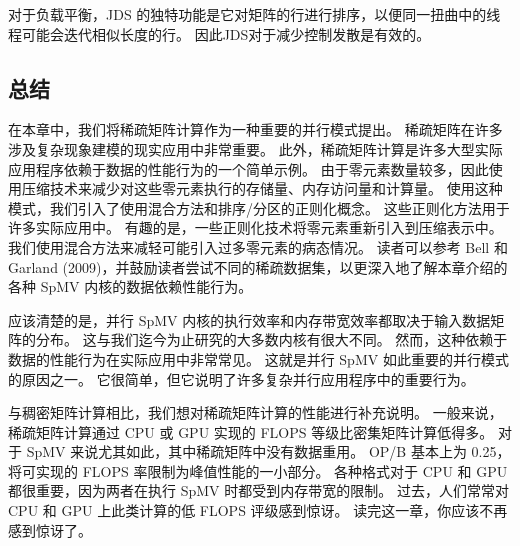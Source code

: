对于负载平衡，JDS 的独特功能是它对矩阵的行进行排序，以便同一扭曲中的线程可能会迭代相似长度的行。 因此JDS对于减少控制发散是有效的。

\subsection{总结}
在本章中，我们将稀疏矩阵计算作为一种重要的并行模式提出。 稀疏矩阵在许多涉及复杂现象建模的现实应用中非常重要。 此外，稀疏矩阵计算是许多大型实际应用程序依赖于数据的性能行为的一个简单示例。 由于零元素数量较多，因此使用压缩技术来减少对这些零元素执行的存储量、内存访问量和计算量。 使用这种模式，我们引入了使用混合方法和排序/分区的正则化概念。 这些正则化方法用于许多实际应用中。 有趣的是，一些正则化技术将零元素重新引入到压缩表示中。 我们使用混合方法来减轻可能引入过多零元素的病态情况。 读者可以参考 Bell 和 Garland (2009)，并鼓励读者尝试不同的稀疏数据集，以更深入地了解本章介绍的各种 SpMV 内核的数据依赖性能行为。

应该清楚的是，并行 SpMV 内核的执行效率和内存带宽效率都取决于输入数据矩阵的分布。 这与我们迄今为止研究的大多数内核有很大不同。 然而，这种依赖于数据的性能行为在实际应用中非常常见。 这就是并行 SpMV 如此重要的并行模式的原因之一。 它很简单，但它说明了许多复杂并行应用程序中的重要行为。

与稠密矩阵计算相比，我们想对稀疏矩阵计算的性能进行补充说明。 一般来说，稀疏矩阵计算通过 CPU 或 GPU 实现的 FLOPS 等级比密集矩阵计算低得多。 对于 SpMV 来说尤其如此，其中稀疏矩阵中没有数据重用。 OP/B 基本上为 0.25，将可实现的 FLOPS 率限制为峰值性能的一小部分。 各种格式对于 CPU 和 GPU 都很重要，因为两者在执行 SpMV 时都受到内存带宽的限制。 过去，人们常常对 CPU 和 GPU 上此类计算的低 FLOPS 评级感到惊讶。 读完这一章，你应该不再感到惊讶了。
